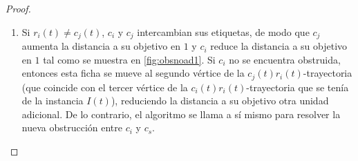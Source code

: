 \begin{proof}
\begin{enumerate}
\begin{enumerate}
            \begin{figure}[ht!]
                \begin{tcbitemize}[raster columns=2,raster equal height,
                    enhanced, colback=Black!5!white,colframe=Grey!75!black,
                    raster every box/.style={minimum for current equal height
                    group=2.5cm, valign=center, halign=center}, boxsep=0mm]
                    \tcbitem 
                    \tcbitem
                \end{tcbitemize}
                \caption{Como $c_j$ est\'a obstruido, el algoritmo pasa a
                enfocarse a resolver la obstrucci\'on para $c_j$, $c_s$.}
                \label{fig:obsad2}
            \end{figure}

            \item Si $r_i(t)\neq c_j(t)$, $c_i$ y $c_j$ intercambian sus
            etiquetas, de modo que $c_j$ aumenta la distancia a su objetivo en
            $1$ y $c_i$ reduce la distancia a su objetivo en $1$ tal como se
            muestra en \cref{fig:obsnoad1}. Si $c_i$ no se
            encuentra obstruida, entonces esta ficha se mueve al segundo
            v\'ertice de la $c_j(t)r_i(t)$-trayectoria (que coincide con el
            tercer v\'ertice de la $c_i(t)r_i(t)$-trayectoria que se ten\'ia de
            la instancia $I(t)$), reduciendo la distancia a su objetivo otra
            unidad adicional. De lo contrario, el algoritmo se llama a s\'i
            mismo para resolver la nueva obstrucci\'on entre $c_i$ y $c_s$.


\end{enumerate}
\end{enumerate}
\end{proof}

